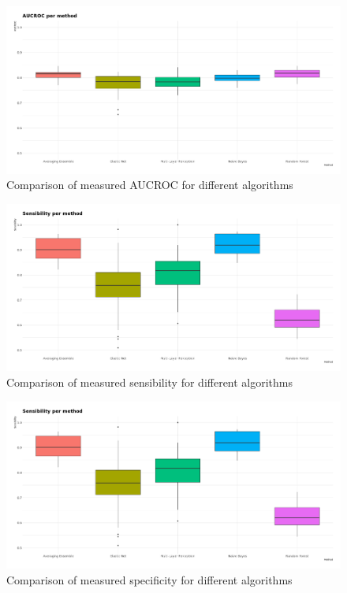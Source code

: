 \begin{figure}[H]
    \caption{Comparison of measured AUCROC for different algorithms}
    \centerline{\includegraphics[scale=.2]{../reports/results/models_and_evals/summary/box_plot_aucroc.png}}
    \label{fig:boxplot-aucroc}
\end{figure}

\begin{figure}[H]
    \caption{Comparison of measured sensibility for different algorithms}
    \centerline{\includegraphics[scale=.2]{../reports/results/models_and_evals/summary/box_plot_sens.png}}
    \label{fig:boxplot-sens}
\end{figure}

\begin{figure}[H]
    \caption{Comparison of measured specificity for different algorithms}
    \centerline{\includegraphics[scale=.2]{../reports/results/models_and_evals/summary/box_plot_spec.png}}
    \label{fig:boxplot-spec}
\end{figure}

